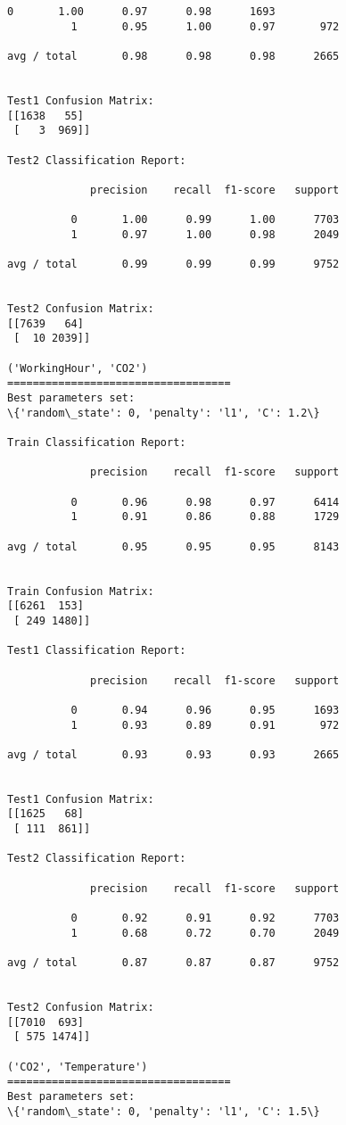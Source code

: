 \documentclass[11pt]{article}
\begin{document}
\begin{Verbatim}[commandchars=\\\{\}]
          0       1.00      0.97      0.98      1693
          1       0.95      1.00      0.97       972

avg / total       0.98      0.98      0.98      2665


Test1 Confusion Matrix:
[[1638   55]
 [   3  969]]

Test2 Classification Report:

             precision    recall  f1-score   support

          0       1.00      0.99      1.00      7703
          1       0.97      1.00      0.98      2049

avg / total       0.99      0.99      0.99      9752


Test2 Confusion Matrix:
[[7639   64]
 [  10 2039]]

('WorkingHour', 'CO2')
===================================
Best parameters set:
\{'random\_state': 0, 'penalty': 'l1', 'C': 1.2\}

Train Classification Report:

             precision    recall  f1-score   support

          0       0.96      0.98      0.97      6414
          1       0.91      0.86      0.88      1729

avg / total       0.95      0.95      0.95      8143


Train Confusion Matrix:
[[6261  153]
 [ 249 1480]]

Test1 Classification Report:

             precision    recall  f1-score   support

          0       0.94      0.96      0.95      1693
          1       0.93      0.89      0.91       972

avg / total       0.93      0.93      0.93      2665


Test1 Confusion Matrix:
[[1625   68]
 [ 111  861]]

Test2 Classification Report:

             precision    recall  f1-score   support

          0       0.92      0.91      0.92      7703
          1       0.68      0.72      0.70      2049

avg / total       0.87      0.87      0.87      9752


Test2 Confusion Matrix:
[[7010  693]
 [ 575 1474]]

('CO2', 'Temperature')
===================================
Best parameters set:
\{'random\_state': 0, 'penalty': 'l1', 'C': 1.5\}


\end{Verbatim}
\end{document}
